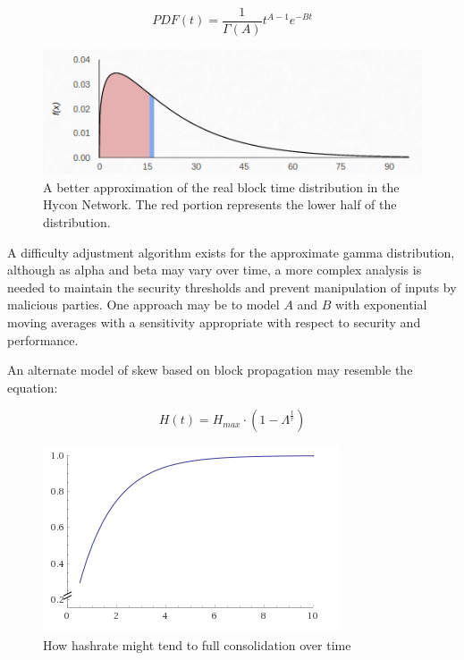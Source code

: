 \documentclass[]{article}
\begin{document}
\begin{equation}
PDF(t) = \frac{1}{\Gamma(A)} t^{A - 1}e^{-Bt}
\end{equation}

\begin{figure}[h]
	\centering
	\includegraphics[width=0.7\linewidth]{"./real hycon"}
	\caption{\footnotesize A better approximation of the real block time distribution in the Hycon Network. The red portion represents the lower half of the distribution. \cite{GammaDistHycon}}
\end{figure}

A difficulty adjustment algorithm exists for the approximate gamma distribution, although as alpha and beta may vary over time, a more complex analysis is needed to maintain the security thresholds and prevent manipulation of inputs by malicious parties.  One approach may be to model $A$ and $B$ with exponential moving averages with a sensitivity appropriate with respect to security and performance.  
\newline

\pagebreak

An alternate model of skew based on block propagation may resemble the equation: 

\begin{equation}
	H(t) = H_{max} \cdot (1 - \Lambda^\frac{t}{\tau})
\end{equation}

\begin{figure}[h]
	\centering
	\includegraphics[width=0.7\linewidth]{"./hashpower ramp"}
	\caption{\footnotesize How hashrate might tend to full consolidation over time \cite{Wolfram}}
\end{figure}
\end{document}
